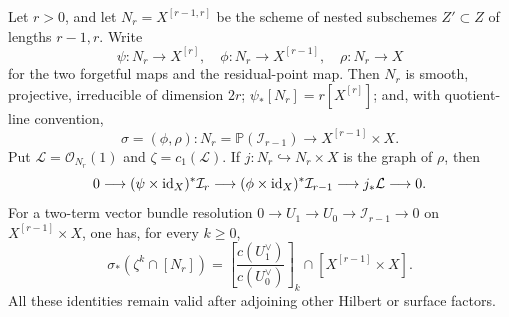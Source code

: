 \begin{lemma}
\label{rel:hilbert-recursion}
Let $r>0$, and let $N_r=X^{[r-1,r]}$ be the scheme of nested
subschemes $Z'\subset Z$ of lengths $r-1,r$.  Write
\[
 \psi:N_r\longrightarrow X^{[r]},\quad
 \phi:N_r\longrightarrow X^{[r-1]},\quad
 \rho:N_r\longrightarrow X
\]
for the two forgetful maps and the residual-point map.  Then $N_r$ is
smooth, projective, irreducible of dimension $2r$;
$\psi_*[N_r]=r[X^{[r]}]$; and, with quotient-line convention,
\[
 \sigma=(\phi,\rho):N_r
 =\mathbb P(\mathcal I_{r-1})
 \longrightarrow X^{[r-1]}\times X.
\]
Put $\mathcal L=\mathcal O_{N_r}(1)$ and $\zeta=c_1(\mathcal L)$.
If $j:N_r\hookrightarrow N_r\times X$ is the graph of $\rho$, then
\begin{equation}
 0\longrightarrow(\psi\times\operatorname{id}_X)^*\mathcal I_r
 \longrightarrow(\phi\times\operatorname{id}_X)^*\mathcal I_{r-1}
 \longrightarrow j_*\mathcal L\longrightarrow0.
 \label{rel:universal-ideal-sequence}
\end{equation}
For a two-term vector bundle resolution
$0\to U_1\to U_0\to\mathcal I_{r-1}\to0$ on
$X^{[r-1]}\times X$, one has, for every $k\geq0$,
\begin{equation}
 \sigma_*(\zeta^k\cap[N_r])
 =\left[\frac{c(U_1^\vee)}{c(U_0^\vee)}\right]_k
 \cap[X^{[r-1]}\times X].
 \label{rel:projective-pushdown}
\end{equation}
All these identities remain valid after adjoining other Hilbert or
surface factors.
\end{lemma}

